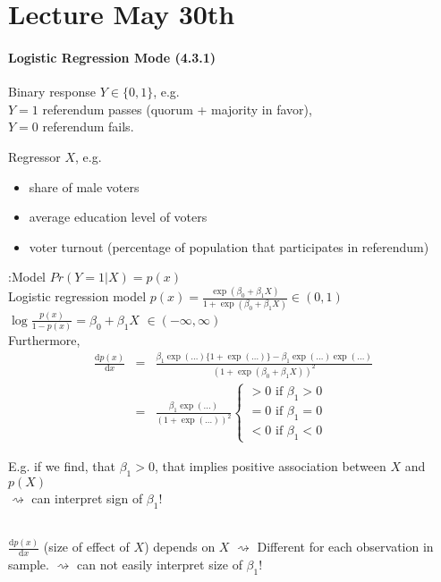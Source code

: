 \documentclass[11pt,a4paper,numbers=endperiod]{scrartcl}
\newcommand{\id}{\hspace*{4mm}}
\newcommand{\dif}{\mathrm{d}}
\newcommand{\tit}[1]{\begin{large} \underline{\text{#1}}\end{large}}
\begin{document}
{\section{Lecture May 30th} 

\paragraph{Logistic Regression Mode (4.3.1)}
$ $\\

Binary response $Y \in \{0, 1\}$, e.g.\\
 $Y = 1$ referendum passes (quorum + majority in favor),\\
 $Y = 0$ referendum fails.

Regressor $X$, e.g. \begin{itemize}
	\item share of male voters
	\item average education level of voters
	\item voter turnout (percentage of population that participates in referendum) 
\end{itemize}

\tit{Aim}:\id Model $Pr(Y= 1|X) = p(x)$\\
\id Logistic regression model $p(x) = \frac{\exp(\beta_0 + \beta_1 X)}{1 + \exp(\beta_0 + \beta_1 X)} \in (0,1)$\\
\id $\log \frac{p(x)}{1 - p(x)} = \beta_0 + \beta_1 X$ $\in (-\infty, \infty)$\\

Furthermore, \begin{eqnarray*}
	\frac{\dif p(x)}{\dif x} &=& \frac{\beta_1 \exp(\ldots) \{1 + \exp(\ldots)\} - \beta_1 \exp(\ldots) \exp(\ldots)}{(1 + \exp(\beta_0 + \beta_1X))^2}\\
	&=& \frac{\beta_1 \exp(\ldots)}{(1+ \exp(\ldots))^2}  \begin{cases}
	 > 0 \text{ if } \beta_1 > 0\\
	 = 0 \text{ if } \beta_1 = 0\\
	 < 0 \text{ if } \beta_1 < 0
\end{cases}
\end{eqnarray*}

E.g. if we find, that $\beta_1 > 0$, that implies positive association between $X$ and $p(X)$\\
$\rightsquigarrow$ can interpret sign of $\beta_1$!\\
\tit{Note:}\\
$\frac{\dif p(x)}{\dif x}$ (size of effect of $X$) depends on $X$ $\rightsquigarrow$ Different for each observation in sample. $\rightsquigarrow$ can not easily interpret size of $\beta_1$!\\

}
\end{document}
